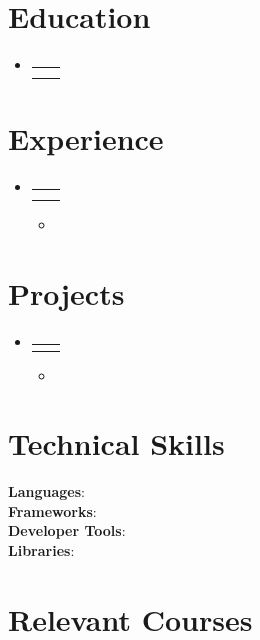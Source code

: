 \documentclass[letterpaper,11pt]{article}
\makeatletter
\newcommand{\resumeItem}[1]{
  \item\small{
    {#1 \vspace{-2pt}}
  }
}
\newcommand{\resumeSubheading}[4]{
  \vspace{-2pt}\item
    \begin{tabular*}{0.97\textwidth}[t]{l@{\extracolsep{\fill}}r}
      \textbf{#1} & #2 \\
      \textit{\small#3} & \textit{\small #4} \\
    \end{tabular*}\vspace{-7pt}
}
\newcommand{\resumeProjectHeading}[2]{
    \item
    \begin{tabular*}{0.97\textwidth}{l@{\extracolsep{\fill}}r}
      \small#1 & #2 \\
    \end{tabular*}\vspace{-7pt}
}
\newcommand{\resumeSubHeadingListStart}{\begin{itemize}[leftmargin=0.15in, label={}]}
\newcommand{\resumeSubHeadingListEnd}{\end{itemize}}
\newcommand{\resumeItemListStart}{\begin{itemize}}
\newcommand{\resumeItemListEnd}{\end{itemize}\vspace{-5pt}}
\makeatother
\begin{document}
\begin{center}
    \textbf{\Huge \scshape } \\ \vspace{1pt}
    \small
\end{center}

\section{Education}
  \resumeSubHeadingListStart
    \resumeSubheading{}{}{}{}
  \resumeSubHeadingListEnd

\section{Experience}
  \resumeSubHeadingListStart
    \resumeSubheading{}{}{}{}
      \resumeItemListStart
        \resumeItem{}
      \resumeItemListEnd
  \resumeSubHeadingListEnd

\section{Projects}
  \resumeSubHeadingListStart
    \resumeProjectHeading{}{}
      \resumeItemListStart
        \resumeItem{}
      \resumeItemListEnd
  \resumeSubHeadingListEnd

\section{Technical Skills}
  \begin{itemize}[leftmargin=0.15in, label={}]
    \small{\item{
      \textbf{Languages}{: } \\
      \textbf{Frameworks}{: } \\
      \textbf{Developer Tools}{: } \\
      \textbf{Libraries}{: }
    }}
  \end{itemize}

\section{Relevant Courses}
  \begin{itemize}[leftmargin=0.15in, label={}]
    \small{\item{
    }}
  \end{itemize}
\end{document}
